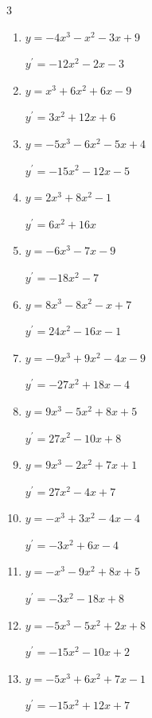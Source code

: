 \begin{multicols}{3}
\begin{enumerate}
  \item $y=-4x^{3}-x^{2}-3x+9$

        $\displaystyle y^{\prime}=-12x^{2}-2x-3$

  \item $y=x^{3}+6x^{2}+6x-9$

        $\displaystyle y^{\prime}=3x^{2}+12x+6$

  \item $y=-5x^{3}-6x^{2}-5x+4$

        $\displaystyle y^{\prime}=-15x^{2}-12x-5$

  \item $y=2x^{3}+8x^{2}-1$

        $\displaystyle y^{\prime}=6x^{2}+16x$

  \item $y=-6x^{3}-7x-9$

        $\displaystyle y^{\prime}=-18x^{2}-7$

  \item $y=8x^{3}-8x^{2}-x+7$

        $\displaystyle y^{\prime}=24x^{2}-16x-1$

  \item $y=-9x^{3}+9x^{2}-4x-9$

        $\displaystyle y^{\prime}=-27x^{2}+18x-4$

  \item $y=9x^{3}-5x^{2}+8x+5$

        $\displaystyle y^{\prime}=27x^{2}-10x+8$

  \item $y=9x^{3}-2x^{2}+7x+1$

        $\displaystyle y^{\prime}=27x^{2}-4x+7$

  \item $y=-x^{3}+3x^{2}-4x-4$

        $\displaystyle y^{\prime}=-3x^{2}+6x-4$

\columnbreak %

  \item $y=-x^{3}-9x^{2}+8x+5$

        $\displaystyle y^{\prime}=-3x^{2}-18x+8$

  \item $y=-5x^{3}-5x^{2}+2x+8$

        $\displaystyle y^{\prime}=-15x^{2}-10x+2$

  \item $y=-5x^{3}+6x^{2}+7x-1$

        $\displaystyle y^{\prime}=-15x^{2}+12x+7$


\end{enumerate}
\end{multicols}

